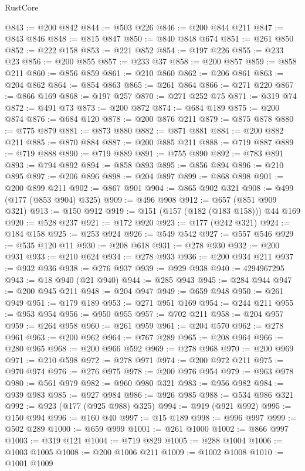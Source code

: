 \begin{lexlean}{RustCore}
\begin{coremodule}
@843 := @200 @842
@844 := @503 @226
@846 := @200 @844 @211
@847 := @843 @846
@848 := @815 @847
@850 := @840 @848 @674
@851 := @261 @850
@852 := @222 @158
@853 := @221 @852
@854 := @197 @226
@855 := @233 @23
@856 := @200 @855
@857 := @233 @37
@858 := @200 @857
@859 := @858 @211
@860 := @856 @859
@861 := @210 @860
@862 := @206 @861
@863 := @204 @862
@864 := @854 @863
@865 := @261 @864
@866 := @271 @220
@867 := @866 @169
@868 := @197 @257
@870 := @271 @252 @75
@871 := @319 @74
@872 := @491 @73
@873 := @200 @872
@874 := @684 @189
@875 := @200 @874
@876 := @684 @120
@878 := @200 @876 @211
@879 := @875 @878
@880 := @775 @879
@881 := @873 @880
@882 := @871 @881
@884 := @200 @882 @211
@885 := @870 @884
@887 := @200 @885 @211
@888 := @719 @887
@889 := @719 @888
@890 := @719 @889
@891 := @755 @890
@892 := @783 @891
@893 := @794 @892
@894 := @858 @893
@895 := @856 @894
@896 := @210 @895
@897 := @206 @896
@898 := @204 @897
@899 := @868 @898
@901 := @200 @899 @211
@902 := @867 @901
@904 := @865 @902 @321
@908 := @499 (@177 (@853 @904) @325)
@909 := @496 @908
@912 := @657 (@851 @909 @321)
@913 := @150 @912
@919 := @151 (@157 (@182 (@183 @158))) @44 @169
@920 := @528 @237
@921 := @172 @920
@923 := @177 (@242 @321)
@924 := @184 @158
@925 := @253 @924
@926 := @549 @542
@927 := @557 @546
@929 := @535 @120 @11
@930 := @208 @618
@931 := @278 @930
@932 := @200 @931
@933 := @210 @624
@934 := @278 @933
@936 := @200 @934 @211
@937 := @932 @936
@938 := @276 @937
@939 := @929 @938
@940 := 4294967295
@943 := @18 @940 (@21 @940)
@944 := @285 @943
@945 := @284 @944
@947 := @200 @945 @211
@948 := @204 @947
@949 := @659 @948
@950 := @261 @949
@951 := @179 @189
@953 := @271 @951 @169
@954 := @244 @211
@955 := @953 @954
@956 := @950 @955
@957 := @702 @211
@958 := @204 @957
@959 := @264 @958
@960 := @261 @959
@961 := @204 @570
@962 := @278 @961
@963 := @200 @962
@964 := @767 @289
@965 := @208 @964
@966 := @280 @965
@968 := @200 @966 @592
@969 := @278 @968
@970 := @200 @969
@971 := @210 @598
@972 := @278 @971
@974 := @200 @972 @211
@975 := @970 @974
@976 := @276 @975
@978 := @200 @976 @954
@979 := @963 @978
@980 := @561 @979
@982 := @960 @980 @321
@983 := @956 @982
@984 := @939 @983
@985 := @927 @984
@986 := @926 @985
@988 := @534 @986 @321
@992 := @923 (@177 (@925 @988) @325)
@994 := @919 (@921 @992)
@995 := @150 @994
@996 := @160 @40
@997 := @15 @189
@998 := @996 @997
@999 := @502 @289
@1000 := @659 @999
@1001 := @261 @1000
@1002 := @866 @997
@1003 := @319 @121
@1004 := @719 @829
@1005 := @288 @1004
@1006 := @1003 @1005
@1008 := @200 @1006 @211
@1009 := @1002 @1008
@1010 := @1001 @1009

\end{coremodule}
\end{lexlean}
